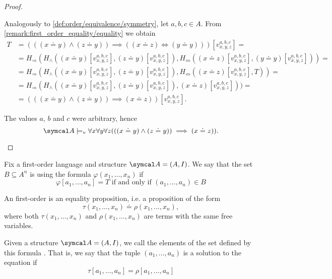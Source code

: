 \begin{proof}
\begin{description}
     Analogously to \ref{def:order/equivalence/symmetry}, let \( a, b, c \in A \). From \cref{remark:first_order_equality/equality} we obtain
    \begin{align*}
      T &=
      (((x \doteq y) \land (z \doteq y)) \implies ((x \doteq z) \iff (y \doteq y)))[v_{x,y,z}^{a,b,c}]
      = \\ &=
      H_\Rightarrow(H_\land((x \doteq y)[v_{x,y,z}^{a,b,c}], (z \doteq y)[v_{x,y,z}^{a,b,c}]), H_\Leftrightarrow((x \doteq z)[v_{x,y,z}^{a,b,c}], (y \doteq y)[v_{x,y,z}^{a,b,c}]))
      = \\ &=
      H_\Rightarrow(H_\land((x \doteq y)[v_{x,y,z}^{a,b,c}], (z \doteq y)[v_{x,y,z}^{a,b,c}]), H_\Leftrightarrow((x \doteq z)[v_{x,y,z}^{a,b,c}], T))
      = \\ &=
      H_\Rightarrow(H_\land((x \doteq y)[v_{x,y,z}^{a,b,c}], (z \doteq y)[v_{x,y,z}^{a,b,c}]), (x \doteq z)[v_{x,y,z}^{a,b,c}]))
      = \\ &=
      (((x \doteq y) \land (z \doteq y)) \implies (x \doteq z))[v_{x,y,z}^{a,b,c}].
    \end{align*}

    The values \( a \), \( b \) and \( c \) were arbitrary, hence
    \begin{equation*}
      \Cal{A} \models_v \forall x \forall y \forall z (((x \doteq y) \land (z \doteq y)) \implies (x \doteq z)).
    \end{equation*}
  \end{description}
\end{proof}

\begin{definition}\label{def:first_order_definability}
  Fix a first-order language and structure \( \Cal{A} = (A, I) \). We say that the set \( B \subseteq A^n \) is  using the formula \( \varphi(x_1, \ldots, x_n) \) if
  \begin{equation*}
    \varphi[a_1, \ldots, a_n] = T \text{ if and only if } (a_1, \ldots, a_n) \in B
  \end{equation*}
\end{definition}

\begin{definition}\label{def:first_order_equation}
  An first-order  is an equality proposition, i.e. a proposition of the form
  \begin{equation*}
    \tau(x_1, \ldots, x_n) \doteq \rho(x_1, \ldots, x_n),
  \end{equation*}
  where both \( \tau(x_1, \ldots, x_n) \) and \( \rho(x_1, \ldots, x_n) \) are terms with the same free variables.

  Given a structure \( \Cal{A} = (A, I) \), we call the elements of the set defined by this formula . That is, we say that the tuple \( (a_1, \ldots, a_n) \) is a solution to the equation if
  \begin{equation*}
    \tau[a_1, \ldots, a_n] = \rho[a_1, \ldots, a_n]
  \end{equation*}
\end{definition}

